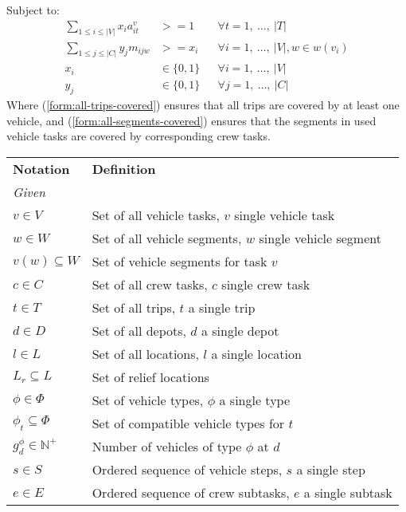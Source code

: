 \documentclass[]{article}
\begin{document}
Subject to:
\begin{align}
\sum_{1 \leq i \leq |V|} x_{i}a^v_{it} &>= 1 && \forall t = 1,\:\dots,\:|T| \label{form:all-trips-covered} \\
\sum_{1 \leq j \leq |C|} y_{j}m_{ijw} &>= x_{i} && \forall i = 1,\:\dots,\:|V|, w \in w(v_i) \label{form:all-segments-covered} \\
x_{i} &\in \{ 0, 1 \} && \forall i = 1,\:\dots,\:|V| \\
y_{j} &\in \{ 0, 1 \} && \forall j = 1,\:\dots,\:|C|
\end{align}
Where (\ref{form:all-trips-covered}) ensures that all trips are covered by at least one vehicle, and (\ref{form:all-segments-covered}) ensures that the segments in used vehicle tasks are covered by corresponding crew tasks.

\begin{table}
  \centering
  \begin{tabular}{ll}
    \toprule
    \multicolumn{1}{l}{\textbf{Notation}} & \multicolumn{1}{l}{\textbf{Definition}}               \\
    \cmidrule(lr){1-1}\cmidrule(lr){2-2}
    \multicolumn{2}{l}{\textit{Given}} \\
    $v \in V$ & Set of all vehicle tasks, $v$ single vehicle task \\
    $w \in W$ & Set of all vehicle segments, $w$ single vehicle segment \\
    $v(w) \subseteq W$ & Set of vehicle segments for task $v$ \\ 
    $c \in C$ & Set of all crew tasks, $c$ single crew task \\
    $t \in T$ & Set of all trips, $t$ a single trip \\
    $d \in D$ & Set of all depots, $d$ a single depot \\
    $l \in L$ & Set of all locations, $l$ a single location \\
    $L_r \subseteq L$ & Set of relief locations \\ 
    $\phi \in \Phi$ & Set of vehicle types, $\phi$ a single type \\
    $\phi_t \subseteq \Phi$ & Set of compatible vehicle types for $t$ \\
    $g^\phi_{d} \in \mathbb{N}^+$ & Number of vehicles of type $\phi$ at $d$ \\
    $s \in S$ & Ordered sequence of vehicle steps, $s$ a single step \\ 
    $e \in E$ & Ordered sequence of crew subtasks, $e$ a single subtask \\ 

\end{tabular}
\end{table}
\end{document}

